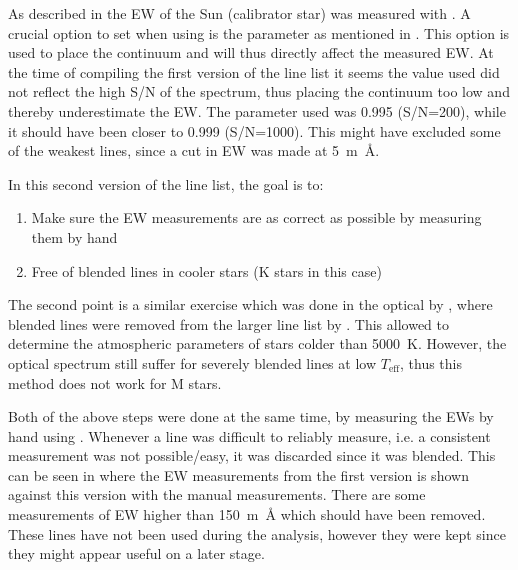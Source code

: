 As described in  the EW of the Sun (calibrator star) was measured with
. A crucial option to set when using  is the  parameter as
mentioned in . This option is used to place the continuum and will thus directly
affect the measured EW. At the time of compiling the first version of the line list it seems the
 value used did not reflect the high S/N of the spectrum, thus placing the continuum too
low and thereby underestimate the EW. The  parameter used was 0.995 (S/N=200), while it
should have been closer to 0.999 (S/N=1000). This might have excluded some of the weakest lines,
since a cut in EW was made at \SI{5}{m\angstrom}.

In this second version of the line list, the goal is to:
\begin{enumerate}
  \item Make sure the EW measurements are as correct as possible by measuring them by hand
  \item Free of blended lines in cooler stars (K stars in this case)
\end{enumerate}
The second point is a similar exercise which was done in the optical by \citet{Tsantaki2013}, where
blended lines were removed from the larger line list by \citet{Sousa2008a}. This allowed to
determine the atmospheric parameters of stars colder than \SI{5000}{K}. However, the optical
spectrum still suffer for severely blended lines at low $T_\mathrm{eff}$, thus this method does not
work for M stars.

Both of the above steps were done at the same time, by measuring the EWs by hand using .
Whenever a line was difficult to reliably measure, i.e. a consistent measurement was not
possible/easy, it was discarded since it was blended. This can be seen in
 where the EW measurements from the first version is shown against
this version with the manual measurements. There are some measurements of EW higher than
\SI{150}{m\angstrom} which should have been removed. These lines have not been used during the
analysis, however they were kept since they might appear useful on a later stage.

